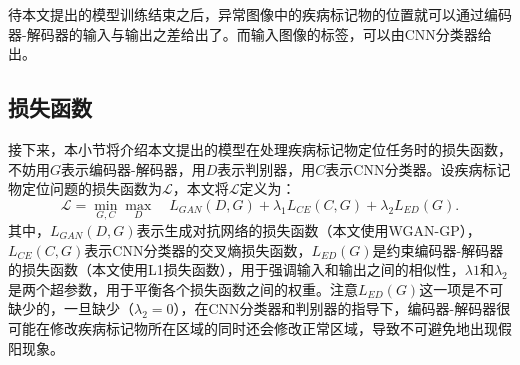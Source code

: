 待本文提出的模型训练结束之后，异常图像中的疾病标记物的位置就可以通过编码器-解码器的输入与输出之差给出了。而输入图像的标签，可以由CNN分类器给出。
\subsection{损失函数}\label{subsec:loss_func}
接下来，本小节将介绍本文提出的模型在处理疾病标记物定位任务时的损失函数，不妨用$G$表示编码器-解码器，用$D$表示判别器，用$C$表示CNN分类器。设疾病标记物定位问题的损失函数为$\mathcal{L}$，本文将$\mathcal{L}$定义为：
\begin{equation}\label{equ:model_loss_func}
\mathcal{L}=\min _{G, C} \max _{D} \quad L_{GAN}(D, G)+\lambda_{1} L_{C E}(C, G)+\lambda_{2} L_{E D}(G).
\end{equation}
其中，$L_{GAN}(D,G)$表示生成对抗网络的损失函数（本文使用WGAN-GP），$L_{CE}(C, G)$表示CNN分类器的交叉熵损失函数，$L_{E D}(G)$是约束编码器-解码器的损失函数（本文使用L1损失函数），用于强调输入和输出之间的相似性，$\lambda{1}$和$\lambda_{2}$是两个超参数，用于平衡各个损失函数之间的权重。注意$L_{E D}(G)$这一项是不可缺少的，一旦缺少（$\lambda_{2}=0$），在CNN分类器和判别器的指导下，编码器-解码器很可能在修改疾病标记物所在区域的同时还会修改正常区域，导致不可避免地出现假阳现象。

